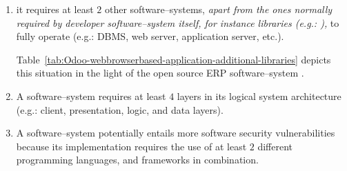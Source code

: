 \begin{enumerate}[1.]
	\item it requires at least $2$ other 
		software--systems, \emph{apart from
		the ones normally required by developer
		software--system itself, for instance libraries (e.g.:
		\logFourJ),} to fully operate
		(e.g.: DBMS, web server, application server, etc.).
		
		Table~\ref{tab:Odoo-webbrowserbased-application-additional-libraries}
		depicts this situation in the light of the
		open source ERP software--system \Odoo.		
				
	\item A \webbrowserbased software--system
		requires at least $4$ layers in
		its logical system architecture
		(e.g.: client, presentation, logic,
		and data layers).

	\item A \webbrowserbased software--system
		potentially entails more software security
		vulnerabilities because its implementation requires
		the use of at least $2$ different programming
		languages, and frameworks in combination.
\end{enumerate}


